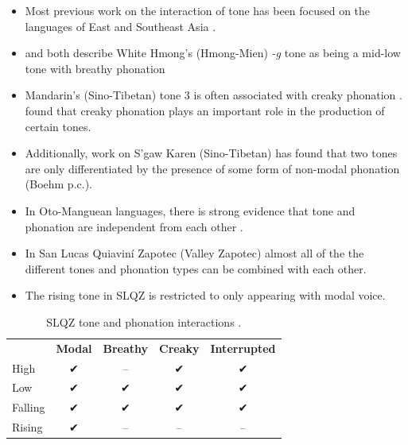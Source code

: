 \documentclass[12pt, letterpaper]{article}
\providecommand{\lsptoprule}{\midrule\toprule}
\providecommand{\lspbottomrule}{\bottomrule\midrule}
\begin{document}
\begin{itemize}
	\item Most previous work on the interaction of tone has been focused on the languages of East and Southeast Asia 
	\citep[e.g.,][]{masicaDefiningLinguisticArea1976,thurgoodVietnameseTonogenesisRevising2002,yipTone2002,enfieldArealLinguisticsMainland2005,michaudComplexTonesEast2012,brunelleTonePhonationSoutheast2016}.
	\item \citet{smalleyProblemsConsonantsTone1976} and \citet{ratliffMeaningfulToneStudy1992} both describe White Hmong's (Hmong-Mien) \textit{-g} tone as being a mid-low tone with breathy phonation
	\item Mandarin's (Sino-Tibetan) tone 3 is often associated with creaky phonation \citep{hockettPeipingPhonology1947}. \citet{brunelleTonePerceptionNorthern2009} found that creaky phonation plays an important role in the production of certain tones. 
	\item Additionally, work on S'gaw Karen (Sino-Tibetan) has found that two tones are only differentiated by the presence of some form of non-modal phonation (Boehm p.c.). 
	\item In Oto-Manguean languages, there is strong evidence that tone and phonation are independent from each other \citep[e.g.,][]{silvermanLaryngealComplexityOtomanguean1997,avelinobecerraTopicsYalalagZapotec2004,avelinoAcousticElectroglottographicAnalyses2010, chavez-peonInteractionMetricalStructure2010, campbellZenzontepecChatinoAspect2011,garellekAcousticConsequencesPhonation2011,villardPhonologyMorphologyZacatepec2015, lopeznicolasEstudiosFonologiaGramatica2016,ariza-garciaPhonationTypesTones2018}. 
	\item In San Lucas Quiaviní Zapotec (Valley Zapotec) almost all of the the different tones and phonation types can be combined with each other.
	\item The rising tone in SLQZ is restricted to only appearing with modal voice. 
\end{itemize}

\begin{table}[!ht]
	\centering
	\caption{SLQZ tone and phonation interactions \citep{chavez-peonInteractionMetricalStructure2010}.}
	\label{tab:SLQZ}
	 \begin{tabular}{lcccc}
	  \lsptoprule
					  &	 \textbf{Modal}  & \textbf{Breathy} & \textbf{Creaky} & \textbf{Interrupted} \\
		  High	& ✔︎ & -- & ✔︎ & ✔︎ \\
		  Low & ✔︎ & ✔︎ & ✔︎ & ✔︎ \\
		  Falling & ✔︎ & ✔︎ & ✔︎ & ✔︎ \\
		  Rising & ✔︎ & -- & -- & -- \\
	  \lspbottomrule
	 \end{tabular}
\end{table}
\end{document}
